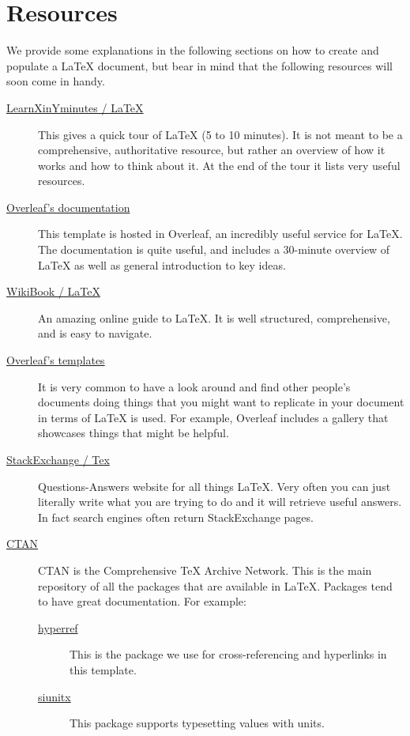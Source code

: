 \documentclass[11pt,twoside,openright]{report}
\begin{document}
\section{Resources}
\label{sec:Resources}

We provide some explanations in the following sections on how to create and populate a \LaTeX{} document, 
but bear in mind that the following resources will soon come in handy.

\begin{description}
  \item[\href{https://learnxinyminutes.com/docs/latex}{LearnXinYminutes / LaTeX}]
    This gives a quick tour of \LaTeX{} (5 to 10 minutes).
    It is not meant to be a comprehensive, authoritative resource, but rather an overview of how it works and how to think about it.
    At the end of the tour it lists very useful resources.

  \item[\href{https://www.overleaf.com/learn}{Overleaf's documentation}]
    This template is hosted in Overleaf, an incredibly useful service for \LaTeX{}.
    The documentation is quite useful, and includes a 30-minute overview of \LaTeX{} as well as general introduction to key ideas.
  
  \item[\href{https://en.wikibooks.org/wiki/LaTeX}{WikiBook / LaTeX}]
    An amazing online guide to \LaTeX{}.
    It is well structured, comprehensive, and is easy to navigate.

  \item[\href{https://www.overleaf.com/gallery}{Overleaf's templates}]
    It is very common to have a look around and find other people's documents doing things that you might want to replicate in your document in terms of \LaTeX{} is used.
    For example, Overleaf includes a gallery that showcases things that might be helpful.

  \item[\href{https://tex.stackexchange.com/}{StackExchange / Tex}]
    Questions-Answers website for all things \LaTeX{}.
    Very often you can just literally write what you are trying to do
    and it will retrieve useful answers.
    In fact search engines often return StackExchange pages.

  \item[\href{https://ctan.org/}{CTAN}]
    CTAN is the Comprehensive TeX Archive Network.
    This is the main repository of all the packages that are available in \LaTeX{}.
    Packages tend to have great documentation.
    For example:
    \begin{description}
        \item[\href{https://ctan.org/pkg/hyperref}{hyperref}] 
            This is the package we use for cross-referencing and hyperlinks
            in this template.
        \item[\href{https://ctan.org/pkg/siunitx}{siunitx}]
            This package supports typesetting values with units.
    \end{description}
\end{description}
\end{document}
